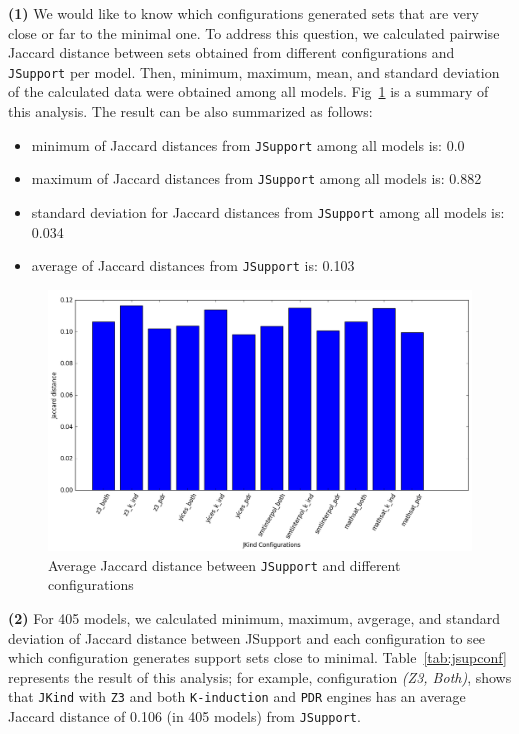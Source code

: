 \textbf{(1)} We would like to know which configurations generated sets that are very close or far to the minimal one. To address this question, we calculated pairwise Jaccard distance between sets obtained from different configurations and \texttt{JSupport} per model. Then, minimum, maximum, mean, and standard deviation of the calculated data were obtained among all models. Fig~\ref{fig:jsupjadis} is a summary of this analysis. The result can be also summarized as follows:
\begin{itemize}
  \item minimum of Jaccard distances from \texttt{JSupport} among all models is: 0.0
  \item maximum of Jaccard distances from \texttt{JSupport} among all models is: 0.882
  \item standard deviation for Jaccard distances from \texttt{JSupport} among all models is: 0.034
  \item average of Jaccard distances from \texttt{JSupport} is: 0.103
\end{itemize}


\begin{figure}
  \centering
  \includegraphics[width=\textwidth]{figs/jsupport_analyses.png}
  \caption{\small{Average Jaccard distance between \texttt{JSupport} and different configurations}}\label{fig:jsupjadis}
\end{figure}

\vspace{6pt}
\noindent{}
 \vspace{9pt}

\textbf{(2)} For 405 models, we calculated minimum, maximum, avgerage, and standard deviation of Jaccard distance between JSupport and each configuration
to see which configuration generates support sets close to minimal.
Table~\ref{tab:jsupconf} represents the result of this analysis; for example, configuration \emph{(Z3, Both)}, shows that \texttt{JKind} with \texttt{Z3} and both \texttt{K-induction} and \texttt{PDR} engines has an average Jaccard distance of 0.106 (in 405 models) from \texttt{JSupport}.


